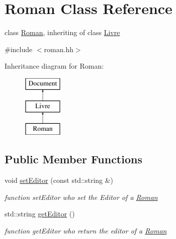 \hypertarget{classRoman}{
\section{Roman Class Reference}
\label{classRoman}
}


class \hyperlink{classRoman}{Roman}, inheriting of class \hyperlink{classLivre}{Livre}  




{\ttfamily \#include $<$roman.hh$>$}

Inheritance diagram for Roman:\begin{figure}[H]
\begin{center}
\leavevmode
\includegraphics[height=3.000000cm]{classRoman}
\end{center}
\end{figure}
\subsection*{Public Member Functions}
\begin{DoxyCompactItemize}
\item 
\hypertarget{classRoman_a8efc9c2048221b38f90d487bd321b1dc}{
void \hyperlink{classRoman_a8efc9c2048221b38f90d487bd321b1dc}{setEditor} (const std::string \&)}
\label{classRoman_a8efc9c2048221b38f90d487bd321b1dc}

\begin{DoxyCompactList}\small\item\em function setEditor who set the Editor of a \hyperlink{classRoman}{Roman} \item\end{DoxyCompactList}\item 
\hypertarget{classRoman_a43760a779145a268fbe84222f31a08a1}{
std::string \hyperlink{classRoman_a43760a779145a268fbe84222f31a08a1}{getEditor} ()}
\label{classRoman_a43760a779145a268fbe84222f31a08a1}

\begin{DoxyCompactList}\small\item\em function getEditor who return the editor of a \hyperlink{classRoman}{Roman} \item\end{DoxyCompactList}\end{DoxyCompactItemize}
